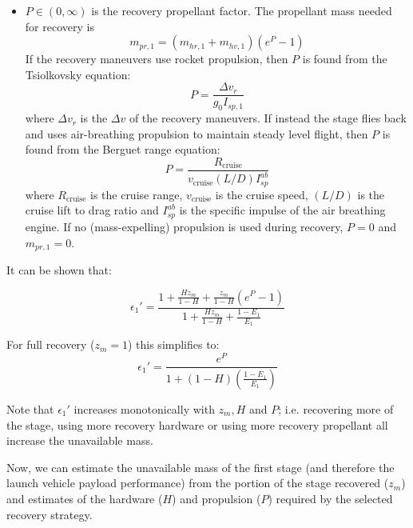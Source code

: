 \documentclass[conf]{new-aiaa}
\begin{document}
\begin{multicols}{2}
\begin{itemize}
    \item $P \in (0, \infty)$  is the recovery propellant factor. The propellant mass needed for recovery is
    \begin{equation}
    m_{pr,1} = (m_{hr,1} + m_{hv,1}) \left( e^P - 1 \right)
    \end{equation}
    If the recovery maneuvers use rocket propulsion, then $P$ is found from the Tsiolkovsky equation:
    \begin{equation}
    \label{eq:rocket_p}
    P = \frac{\Delta v_r}{g_0 I_{sp,1}}
    \end{equation}
    where $\Delta v_r$ is the $\Delta v$ of the recovery maneuvers. If instead the stage flies back and uses air-breathing propulsion to maintain steady level flight, then $P$ is found from the Berguet range equation:
    \begin{equation}
    \label{eq:berguet_p}
    P =  \frac{R_{\mathrm{cruise}}}{v_{\mathrm{cruise}} (L/D) I_{sp}^{ab}}
    \end{equation}
    where $R_{\mathrm{cruise}}$ is the cruise range, $v_{\mathrm{cruise}}$ is the cruise speed, $(L/D)$ is the cruise lift to drag ratio and $I_{sp}^{ab}$ is the specific impulse of the air breathing engine. If no (mass-expelling) propulsion is used during recovery, $P = 0$ and $m_{pr,1} = 0$.
\end{itemize}

It can be shown that:

\begin{equation}
\label{eq:eps_h_p_z}
\epsilon_1' = \frac{1 + \frac{H z_m}{1 - H} +  \frac{z_m}{1 - H} (e^P - 1) }{1 + \frac{H z_m}{1 - H} + \frac{1 - E_1}{E_1} }
\end{equation}

For full recovery ($z_m = 1$) this simplifies to:
\begin{equation}
\epsilon_1' = \frac{e^P}{1 + (1 - H) \left( \frac{1 - E_1}{E_1} \right)}
\end{equation}

Note that $\epsilon_1'$ increases monotonically with $z_m, H$ and $P$; i.e. recovering more of the stage, using more recovery hardware or using more recovery propellant all increase the unavailable mass.

Now, we can estimate the unavailable mass of the first stage (and therefore the launch vehicle payload performance) from the portion of the stage recovered ($z_m$) and estimates of the hardware ($H$) and propulsion ($P$) required by the selected recovery strategy. 


\end{multicols}
\end{document}
